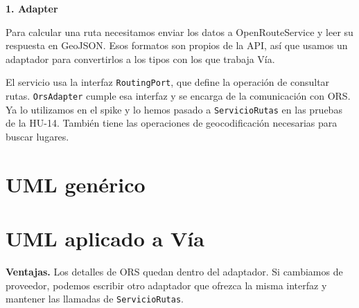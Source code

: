 \documentclass[10pt,a4paper]{article}
\newcommand{\titulo}[2]{{\LARGE\bfseries #1. #2}\par}
\newcommand{\apartado}[1]{\section*{\large #1}}
\begin{document}
\titulo{1}{Adapter}
Para calcular una ruta necesitamos enviar los datos a OpenRouteService y leer su respuesta en GeoJSON. Esos formatos son propios de la API, así que usamos un adaptador para convertirlos a los tipos con los que trabaja Vía.

El servicio usa la interfaz \texttt{RoutingPort}, que define la operación de consultar rutas. \texttt{OrsAdapter} cumple esa interfaz y se encarga de la comunicación con ORS. Ya lo utilizamos en el spike y lo hemos pasado a \texttt{ServicioRutas} en las pruebas de la HU-14. También tiene las operaciones de geocodificación necesarias para buscar lugares.

\apartado{UML genérico}
\begin{center}\end{center}

\apartado{UML aplicado a Vía}
\begin{center}\end{center}

\textbf{Ventajas.} Los detalles de ORS quedan dentro del adaptador. Si cambiamos de proveedor, podemos escribir otro adaptador que ofrezca la misma interfaz y mantener las llamadas de \texttt{ServicioRutas}.
\end{document}
